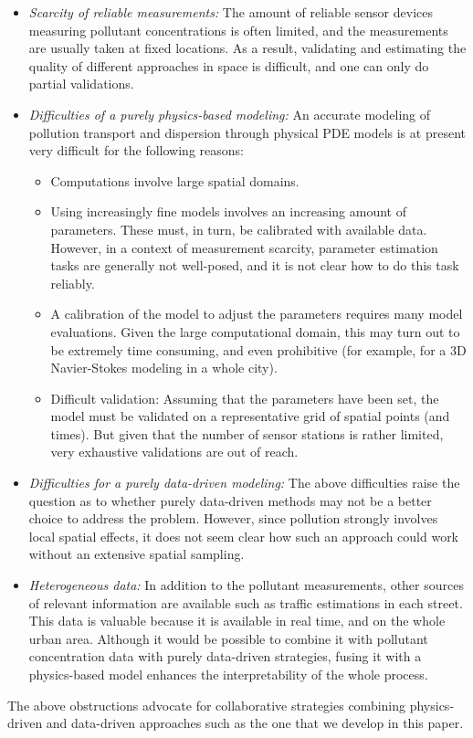 \documentclass[11pt,a4paper,twoside]{article}
\theoremstyle{definition}
\numberwithin{equation}{section}
\newcommand{\<}{\langle}
\renewcommand{\>}{\rangle}
\begin{document}
\begin{itemize}
\item \emph{Scarcity of reliable measurements:} The amount of reliable sensor devices measuring pollutant concentrations is often limited, and the measurements are usually taken at fixed locations. As a result, validating and estimating the quality of different approaches in space is difficult, and one can only do partial validations.  
\item \emph{Difficulties of a purely physics-based modeling:} An accurate modeling of pollution transport and dispersion through physical PDE models is at present very difficult for the following reasons:
\begin{itemize}
\item Computations involve large spatial domains.
\item Using increasingly fine models involves an increasing amount of parameters. These must, in turn, be calibrated with available data. However, in a context of measurement scarcity, parameter estimation tasks are generally not well-posed, and it is not clear how to do this task reliably.
\item A calibration of the model to adjust the parameters requires many model evaluations. Given the large computational domain, this may turn out to be extremely time consuming, and even prohibitive (for example, for a 3D Navier-Stokes modeling in a whole city).
\item Difficult validation: Assuming that the parameters have been set, the model must be validated on a representative grid of spatial points (and times). But given that the number of sensor stations is rather limited, very exhaustive validations are out of reach.
\end{itemize}
\item \emph{Difficulties for a purely data-driven modeling:} The above difficulties raise the question as to whether purely data-driven methods may not be a better choice to address the problem. However, since pollution strongly involves local spatial effects, it does not seem clear how such an approach could work without an extensive spatial sampling.
\item \emph{Heterogeneous data:} In addition to the pollutant measurements, other sources of relevant information are available such as traffic estimations in each street. This data is valuable because it is available in real time, and on the whole urban area. Although it would be possible to combine it with pollutant concentration data with purely data-driven strategies, fusing it with a physics-based model enhances the interpretability of the whole process.
\end{itemize}
The above obstructions advocate for collaborative strategies combining physics-driven and data-driven approaches such as the one that we develop in this paper.
\end{document}
